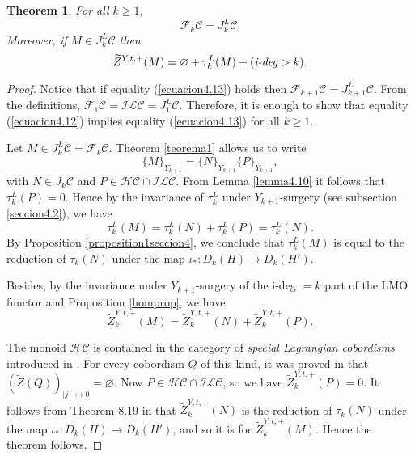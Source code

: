 \documentclass[10pt]{amsart}
\numberwithin{equation}{section}
\numberwithin{equation}{section}
\newtheorem{theorem}{Theorem}[section]
\theoremstyle{definition}
\begin{document}
\begin{theorem} For all $k\geq 1$,
\begin{equation}\label{ecuacion4.12}%
\mathcal{F}_k\mathcal{C}=J_k^L\mathcal{C}.
\end{equation}
Moreover, if $M\in J_k^L\mathcal{C}$ then 
\begin{equation}\label{ecuacion4.13}%
\widetilde{Z}^{Y,t,+}(M)=\varnothing + \tau_k^L(M) + (\text{\emph{i-deg}}>k).
\end{equation}
\end{theorem}
\begin{proof}
Notice that if  equality (\ref{ecuacion4.13}) holds then $\mathcal{F}_{k+1}\mathcal{C}=J_{k+1}^L\mathcal{C}$. From the definitions,  $\mathcal{F}_1\mathcal{C}=\mathcal{ILC}=J_1^L\mathcal{C}$. Therefore, it is enough to show that equality (\ref{ecuacion4.12}) implies equality (\ref{ecuacion4.13}) for all $k\geq 1$.

\noindent Let $M\in J_k^L\mathcal{C}=\mathcal{F}_k\mathcal{C}$. Theorem \ref{teorema1} allows us to  write
$$\{M\}_{Y_{k+1}}=\{N\}_{Y_{k+1}}\{P\}_{Y_{k+1}},$$
with $N\in J_k\mathcal{C}$ and $P\in \mathcal{HC}\cap\mathcal{ILC}$. From Lemma \ref{lemma4.10} it follows that  $\tau_k^L(P)=0$. Hence by the invariance of $\tau_k^L$ under $Y_{k+1}$-surgery (see subsection \ref{seccion4.2}), we have
$$\tau_k^L(M)=\tau_k^L(N)+\tau_k^L(P)=\tau_k^L(N).$$
By Proposition \ref{proposition1seccion4}, we conclude that $\tau_k^L(M)$ is equal to the reduction of $\tau_k(N)$ under the map $\iota_*:D_k(H)\rightarrow D_k(H')$.

\noindent Besides, by the invariance under $Y_{k+1}$-surgery of the i-deg $=k$ part of the  LMO functor  and Proposition \ref{homprop}, we have 
$$\widetilde{Z}^{Y,t,+}_k(M)=\widetilde{Z}^{Y,t,+}_k(N)+\widetilde{Z}^{Y,t,+}_k(P).$$

\noindent The monoid $\mathcal{HC}$ is contained in the category of \emph{special Lagrangian cobordisms} introduced in \cite{MR2403806}. For every  cobordism $Q$ of this kind, it was proved in  \cite[Corollary 5.4]{MR2403806} that $(\widetilde{Z}(Q))_{|j^-\mapsto 0}=\varnothing$.  Now $P\in \mathcal{HC}\cap\mathcal{ILC}$, so  we have $\widetilde{Z}^{Y,t,+}_k(P)=0$. It follows from Theorem 8.19 in \cite{MR2403806} that $\widetilde{Z}^{Y,t,+}_k(N)$ is the reduction of $\tau_k(N)$ under the map $\iota_*:D_k(H)\rightarrow D_k(H')$, and so it is for $\widetilde{Z}^{Y,t,+}_k(M)$. Hence the theorem follows.
\end{proof}
\end{document}
